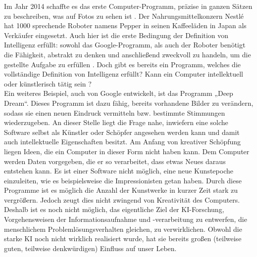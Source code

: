 Im Jahr 2014 schaffte es das erste Computer-Programm, präzise in ganzen Sätzen zu beschreiben, was auf Fotos zu sehen ist \cite{donahue2014}.  Der Nahrungsmittelkonzern Nestlé hat 1000 sprechende Roboter namens Pepper in seinen Kaffeeläden in Japan als Verkäufer eingesetzt.  Auch hier ist die erste Bedingung der Definition von Intelligenz erfüllt: sowohl das Google-Programm, als auch der Roboter benötigt die Fähigkeit, abstrakt zu denken und anschließend zweckvoll zu handeln, um die gestellte Aufgabe zu erfüllen \cite{Spiegel_2}. 
Doch gibt es bereits ein Programm, welches die vollständige Definition von Intelligenz erfüllt? Kann ein Computer intellektuell oder künstlerisch tätig sein \cite{BildDerWissenschaft_1}?\\
%

Ein weiteres Beispiel, auch von Google entwickelt, ist das Programm „Deep Dream“. Dieses Programm ist dazu fähig, bereits vorhandene Bilder zu verändern, sodass sie einen neuen Eindruck vermitteln bzw. bestimmte Stimmungen wiederzugeben.  An dieser Stelle liegt die Frage nahe, inwiefern eine solche Software selbst als Künstler oder Schöpfer angesehen werden kann und damit auch intellektuelle Eigenschaften besitzt. Am Anfang von kreativer Schöpfung liegen Ideen, die ein Computer in dieser Form nicht haben kann. Dem Computer werden Daten vorgegeben, die er so verarbeitet, dass etwas Neues daraus entstehen kann. Es ist einer Software nicht möglich, eine neue Kunstepoche einzuleiten, wie es beispielsweise die Impressionisten getan haben.
Durch diese Programme ist es möglich die Anzahl der Kunstwerke in kurzer Zeit stark zu vergrößern. Jedoch zeugt dies nicht zwingend von Kreativität des Computers. Deshalb ist es noch nicht möglich, das eigentliche Ziel der KI-Forschung, Vorgehensweisen der Informationsaufnahme und -verarbeitung zu entwerfen, die menschlichem Problemlösungsverhalten gleichen, zu verwirklichen. Obwohl die starke KI noch nicht wirklich realisiert wurde, hat sie bereits großen (teilweise guten, teilweise denkwürdigen) Einfluss auf unser Leben.\\
%

